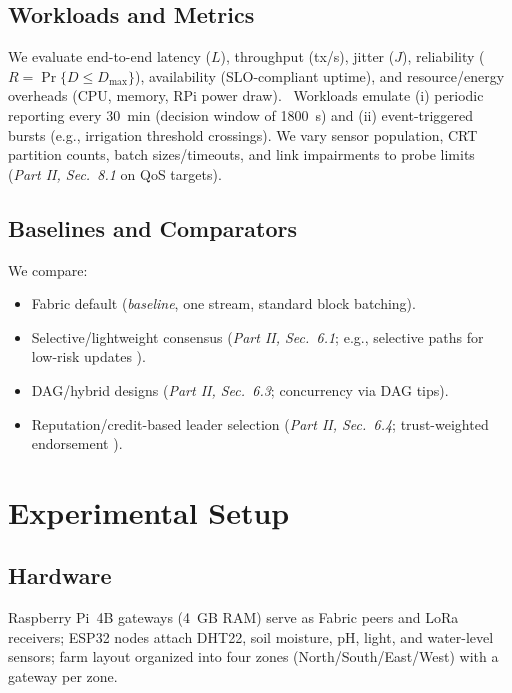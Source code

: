 \subsection{Workloads and Metrics}
We evaluate end-to-end latency ($L$), throughput (tx/s), jitter ($J$), reliability ($R=\Pr\{D\le D_{\max}\}$), availability (SLO-compliant uptime), and resource/energy overheads (CPU, memory, RPi power draw).\ %
Workloads emulate (i) periodic reporting every 30~min (decision window of 1800~s) and (ii) event-triggered bursts (e.g., irrigation threshold crossings). We vary sensor population, CRT partition counts, batch sizes/timeouts, and link impairments to probe limits (\emph{Part II, Sec.~8.1} on QoS targets).

\subsection{Baselines and Comparators}
We compare:
\begin{itemize}
  \item Fabric default (\textit{baseline}, one stream, standard block batching).
  \item Selective/lightweight consensus (\emph{Part II, Sec.~6.1}; e.g., selective paths for low-risk updates \cite{ali2022blockchainenabledarchitecture}).
  \item DAG/hybrid designs (\emph{Part II, Sec.~6.3}; concurrency via DAG tips).
  \item Reputation/credit-based leader selection (\emph{Part II, Sec.~6.4}; trust-weighted endorsement \cite{morais2023surveyonintegration}).
\end{itemize}

\section{Experimental Setup}

\subsection{Hardware}
Raspberry Pi~4B gateways (4~GB RAM) serve as Fabric peers and LoRa receivers; ESP32 nodes attach DHT22, soil moisture, pH, light, and water-level sensors; farm layout organized into four zones (North/South/East/West) with a gateway per zone. %

